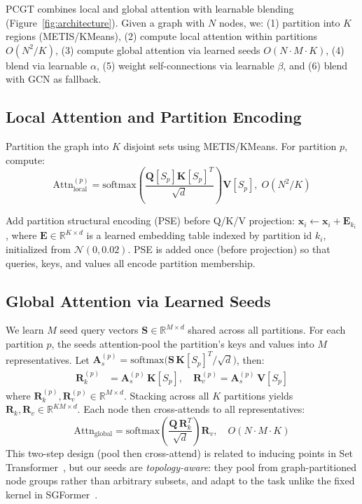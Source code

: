 \documentclass[sigconf]{acmart}
\begin{document}
PCGT combines local and global attention with learnable blending (Figure~\ref{fig:architecture}). Given a graph with $N$ nodes, we: (1) partition into $K$ regions (METIS/KMeans), (2) compute local attention within partitions $O(N^2/K)$, (3) compute global attention via learned seeds $O(N{\cdot}M{\cdot}K)$, (4) blend via learnable $\alpha$, (5) weight self-connections via learnable $\beta$, and (6) blend with GCN as fallback.

\subsection{Local Attention and Partition Encoding}

Partition the graph into $K$ disjoint sets using METIS/KMeans. For partition $p$, compute:
\begin{equation}
\text{Attn}_{\text{local}}^{(p)} = \text{softmax}\!\left( \frac{\mathbf{Q}[S_p] \mathbf{K}[S_p]^T}{\sqrt{d}} \right) \mathbf{V}[S_p],\; O(N^2\!/K)
\end{equation}

Add partition structural encoding (PSE) before Q/K/V projection: $\mathbf{x}_i \leftarrow \mathbf{x}_i + \mathbf{E}_{k_i}$, where $\mathbf{E} \in \mathbb{R}^{K \times d}$ is a learned embedding table indexed by partition id $k_i$, initialized from $\mathcal{N}(0, 0.02)$.  PSE is added once (before projection) so that queries, keys, and values all encode partition membership.

\subsection{Global Attention via Learned Seeds}
\label{sec:global_attn}

We learn $M$ seed query vectors $\mathbf{S} \in \mathbb{R}^{M \times d}$ shared across all partitions. For each partition $p$, the seeds attention-pool the partition's keys and values into $M$ representatives. Let $\mathbf{A}_s^{(p)} = \mathrm{softmax}\!\bigl(\mathbf{S}\,\mathbf{K}[S_p]^T / \sqrt{d}\bigr)$, then:
\begin{align}
\mathbf{R}_k^{(p)} &= \mathbf{A}_s^{(p)}\, \mathbf{K}[S_p], \quad
\mathbf{R}_v^{(p)} = \mathbf{A}_s^{(p)}\, \mathbf{V}[S_p]
\label{eq:reps}
\end{align}
where $\mathbf{R}_k^{(p)}, \mathbf{R}_v^{(p)} \in \mathbb{R}^{M \times d}$. Stacking across all $K$ partitions yields $\mathbf{R}_k, \mathbf{R}_v \in \mathbb{R}^{KM \times d}$. Each node then cross-attends to all representatives:
\begin{equation}
\text{Attn}_{\text{global}} = \text{softmax}\left( \frac{\mathbf{Q} \, \mathbf{R}_k^T}{\sqrt{d}} \right) \mathbf{R}_v, \quad O(N \cdot M \cdot K)
\end{equation}
This two-step design (pool then cross-attend) is related to inducing points in Set Transformer~\citep{lee2019set}, but our seeds are \emph{topology-aware}: they pool from graph-partitioned node groups rather than arbitrary subsets, and adapt to the task unlike the fixed kernel in SGFormer~\citep{wu2023sgformer}.
\end{document}
